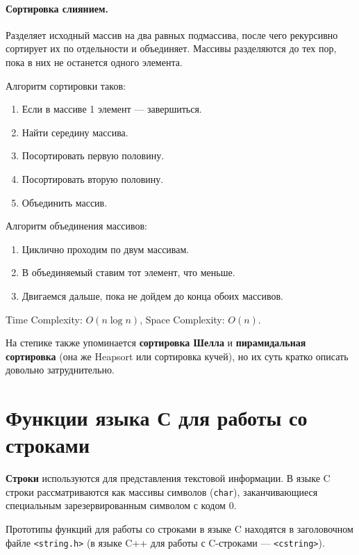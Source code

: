 \documentclass[14pt, a4paper]{extarticle}
\begin{document}
\paragraph{Сортировка слиянием.}
Разделяет исходный массив на два равных подмассива, после чего рекурсивно сортирует их по отдельности и объединяет.
Массивы разделяются до тех пор, пока в них не останется одного элемента.

Алгоритм сортировки таков:
\begin{enumerate}
  \item Если в массиве 1 элемент --- завершиться.
  \item Найти середину массива.
  \item Посортировать первую половину.
  \item Посортировать вторую половину.
  \item Объединить массив.
\end{enumerate}

Алгоритм объединения массивов:
\begin{enumerate}
  \item Циклично проходим по двум массивам.
  \item В объединяемый ставим тот элемент, что меньше.
  \item Двигаемся дальше, пока не дойдем до конца обоих массивов.
\end{enumerate}

Time Complexity: $O(n\log n)$, Space Complexity: $O(n)$.

{\small На степике также упоминается \textbf{сортировка Шелла} и \textbf{пирамидальная сортировка}
(она же Heapsort или сортировка кучей), но их суть кратко описать довольно затруднительно.}

\section{Функции языка С для работы со строками}
\textbf{Строки} используются для представления текстовой информации.
В языке C строки рассматриваются как массивы символов (\verb|char|), заканчивающиеся
специальным зарезервированным символом с кодом 0.


Прототипы функций для работы со строками в языке C находятся в заголовочном файле \verb|<string.h>|
(в языке C++ для работы с C-строками --- \verb|<cstring>|).
\end{document}
